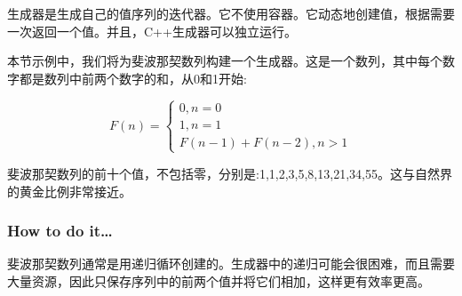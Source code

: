 
生成器是生成自己的值序列的迭代器。它不使用容器。它动态地创建值，根据需要一次返回一个值。并且，C++生成器可以独立运行。

本节示例中，我们将为斐波那契数列构建一个生成器。这是一个数列，其中每个数字都是数列中前两个数字的和，从0和1开始:

\begin{equation*}
F(n)=
\begin{cases}
	0, n = 0 \\
	1, n = 1 \\
	F(n-1) + F(n-2), n > 1
\end{cases}
\end{equation*}

斐波那契数列的前十个值，不包括零，分别是:1,1,2,3,5,8,13,21,34,55。这与自然界的黄金比例非常接近。

\subsubsection{How to do it…}

斐波那契数列通常是用递归循环创建的。生成器中的递归可能会很困难，而且需要大量资源，因此只保存序列中的前两个值并将它们相加，这样更有效率更高。

